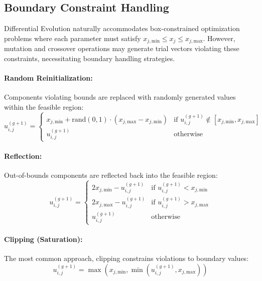 \documentclass[12pt,a4paper]{report}
\begin{document}
\subsection{Boundary Constraint Handling}

Differential Evolution naturally accommodates box-constrained optimization problems where each parameter must satisfy $x_{j,\text{min}} \leq x_j \leq x_{j,\text{max}}$. However, mutation and crossover operations may generate trial vectors violating these constraints, necessitating boundary handling strategies.

\paragraph{Random Reinitialization:}
Components violating bounds are replaced with randomly generated values within the feasible region:
\begin{equation}
u_{i,j}^{(g+1)} = \begin{cases}
x_{j,\text{min}} + \text{rand}(0,1) \cdot (x_{j,\text{max}} - x_{j,\text{min}}) & \text{if } u_{i,j}^{(g+1)} \notin [x_{j,\text{min}}, x_{j,\text{max}}] \\
u_{i,j}^{(g+1)} & \text{otherwise}
\end{cases}
\end{equation}

\paragraph{Reflection:}
Out-of-bounds components are reflected back into the feasible region:
\begin{equation}
u_{i,j}^{(g+1)} = \begin{cases}
2x_{j,\text{min}} - u_{i,j}^{(g+1)} & \text{if } u_{i,j}^{(g+1)} < x_{j,\text{min}} \\
2x_{j,\text{max}} - u_{i,j}^{(g+1)} & \text{if } u_{i,j}^{(g+1)} > x_{j,\text{max}} \\
u_{i,j}^{(g+1)} & \text{otherwise}
\end{cases}
\end{equation}

\paragraph{Clipping (Saturation):}
The most common approach, clipping constrains violations to boundary values:
\begin{equation}
u_{i,j}^{(g+1)} = \max\left(x_{j,\text{min}}, \min(u_{i,j}^{(g+1)}, x_{j,\text{max}})\right)
\end{equation}
\end{document}

